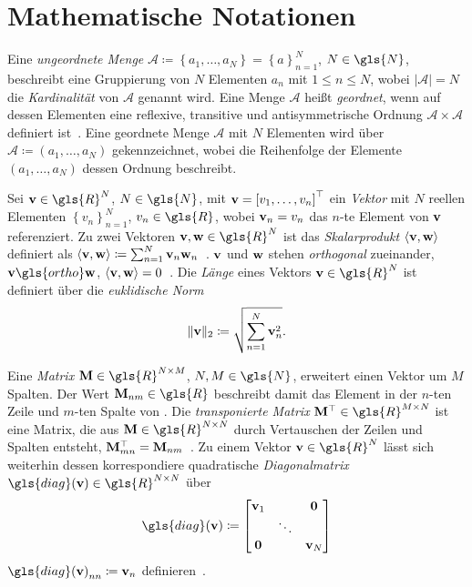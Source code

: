 \section{Mathematische Notationen}
\label{mathematische_notationen}

Eine \emph{ungeordnete Menge} $\mathcal{A} \coloneqq \left\{a_1, \ldots, a_N\right\} = {\left\{a\right\}}_{n=1}^N$, $N \in \gls{N}$, beschreibt eine Gruppierung von $N$ Elementen $a_n$ mit $1 \leq n \leq N$, wobei $\left|\mathcal{A}\right| = N$ die \emph{Kardinalität} von $\mathcal{A}$ genannt wird.
Eine Menge $\mathcal{A}$ heißt \emph{geordnet}, wenn auf dessen Elementen eine reflexive, transitive und antisymmetrische Ordnung $\mathcal{A} \times \mathcal{A}$ definiert ist~\cite{linear}.
Eine geordnete Menge $\mathcal{A}$ mit $N$ Elementen wird über $\mathcal{A} \coloneqq \left(a_1, \ldots, a_N\right)$ gekennzeichnet, wobei die Reihenfolge der Elemente $\left(a_1, \ldots, a_N\right)$ dessen Ordnung beschreibt.

Sei $\ve{v} \in \gls{R}^N$, $N \in \gls{N}$, mit $\ve{v} = {\left[v_1, \ldots, v_n \right]}^{\top}$ ein \emph{Vektor} mit $N$ reellen Elementen ${\left\{v_n\right\}}_{n=1}^N$, $v_n \in \gls{R}$, wobei $\mathbf{v}_n = v_n$ das $n$-te Element von $\mathbf{v}$ referenziert.
Zu zwei Vektoren $\ve{v}, \ve{w} \in \gls{R}^N$ ist das \emph{Skalarprodukt} $\left\langle \ve{v}, \ve{w} \right\rangle$ definiert als $\left\langle \ve{v}, \ve{w}\right\rangle \coloneqq \sum_{n=1}^N \ve{v}_n \ve{w}_n$~\cite{linear}.
$\mathbf{v}$ und $\mathbf{w}$ stehen \emph{orthogonal} zueinander, \dhe{} $\ve{v} \gls{ortho} \ve{w}$, \gdw{} $\left\langle \ve{v}, \ve{w} \right\rangle = 0$~\cite{linear}.
Die \emph{Länge} eines Vektors $\ve{v} \in \gls{R}^N$ ist definiert über die \emph{euklidische Norm}
\begin{equation*}
  \left\| \ve{v} \right\|_2 \coloneqq \sqrt{ \sum_{n=1}^N \ve{v}_n^2}.
\end{equation*}

Eine \emph{Matrix} $\ma{M} \in \gls{R}^{N \times M}$, $N, M \in \gls{N}$, erweitert einen Vektor um $M$ Spalten.
Der Wert $\ma{M}_{nm} \in \gls{R}$ beschreibt damit das Element in der $n$-ten Zeile und $m$-ten Spalte von .
Die \emph{transponierte Matrix} $\ma{M}^{\top} \in \gls{R}^{M \times N}$ ist eine Matrix, die aus $\ma{M} \in \gls{R}^{N \times N}$ durch Vertauschen der Zeilen und Spalten entsteht, \dhe{} $\mathbf{M}^{\top}_{mn} = \mathbf{M}_{nm}$~\cite{linear}.
Zu einem Vektor $\ve{v} \in \gls{R}^{N}$ lässt sich weiterhin dessen korrespondiere quadratische \emph{Diagonalmatrix} $\gls{diag}\left(\ve{v}\right) \in \gls{R}^{N \times N}$
über
\begin{equation*}
  \gls{diag}\left(\ve{v}\right) \coloneqq \begin{bmatrix}
  \ve{v}_1 & & \ve{0}\\
  & \ddots & \\
  \ve{0} & & \ve{v}_N
  \end{bmatrix}
\end{equation*}
\bzw{} ${\gls{diag}\left(\ve{v}\right)}_{nn} \coloneqq \ve{v}_n$ definieren~\cite{Defferrard}.

